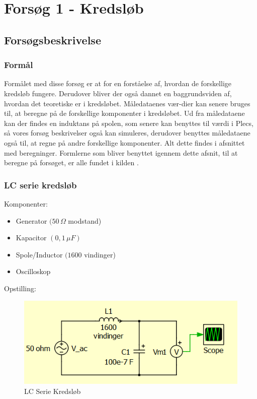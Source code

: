 \section{Forsøg 1 - Kredsløb}

\subsection{Forsøgsbeskrivelse}

\subsubsection{Formål}
Formålet med disse forsøg er at for en forståelse af, hvordan de forskellige kredsløb fungere. Derudover bliver der også dannet en baggrundsviden af, hvordan det teoretiske er i kredsløbet. Måledataenes vær-dier kan senere bruges til, at beregne på de forskellige komponenter i kredsløbet. Ud fra måledataene kan der findes en induktans på spolen, som senere kan benyttes til værdi i Plecs, så vores forsøg beskrivelser også kan simuleres, derudover benyttes måledataene også til, at regne på andre forskellige komponenter. Alt dette findes i afsnittet med beregninger. Formlerne som bliver benyttet igennem dette afsnit, til at beregne på forsøget, er alle fundet i kilden \cite{fysikbog}.

\subsubsection{LC serie kredsløb}

Komponenter:

\begin{itemize}
\item Generator $(50\, \Omega$ modstand)
\item Kapacitor $( 0,1\, \mu F)$
\item Spole/Inductor $(1600$ vindinger)
\item Oscilloskop
\end{itemize}

Opstilling:

\begin{figure}[H]
\centering
\includegraphics[scale=1]{Vildledning/Schematics/Kredslb/LC_Serie}
\caption{LC Serie Kredsløb}
\label{lcserie}
\end{figure}

